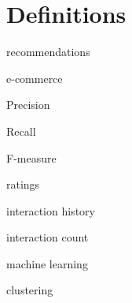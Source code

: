 \chapter{Definitions}\label{cha:definitions}

recommendations

e-commerce

Precision

Recall

F-measure

ratings

interaction history

interaction count

machine learning

clustering
